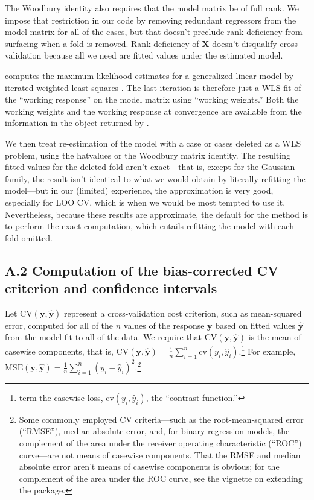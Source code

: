 \documentclass[
]{jss}
\begin{document}
The Woodbury identity also requires that the model matrix be of full
rank. We impose that restriction in our code by removing redundant
regressors from the model matrix for all of the cases, but that doesn't
preclude rank deficiency from surfacing when a fold is removed. Rank
deficiency of \(\mathbf{X}\) doesn't disqualify cross-validation because
all we need are fitted values under the estimated model.

 computes the maximum-likelihood estimates for a generalized
linear model by iterated weighted least squares \citep[see, e.g.,][Sec.
6.12]{FoxWeisberg:2019}. The last iteration is therefore just a WLS fit
of the ``working response'' on the model matrix using ``working
weights.'' Both the working weights and the working response at
convergence are available from the information in the object returned by
.

We then treat re-estimation of the model with a case or cases deleted as
a WLS problem, using the hatvalues or the Woodbury matrix identity. The
resulting fitted values for the deleted fold aren't exact---that is,
except for the Gaussian family, the result isn't identical to what we
would obtain by literally refitting the model---but in our (limited)
experience, the approximation is very good, especially for LOO CV, which
is when we would be most tempted to use it. Nevertheless, because these
results are approximate, the default for the  
method is to perform the exact computation, which entails refitting the
model with each fold omitted.

\subsection*{A.2 Computation of the bias-corrected CV criterion and
confidence
intervals}\label{a.2-computation-of-the-bias-corrected-cv-criterion-and-confidence-intervals}

Let \(\mathrm{CV}(\mathbf{y}, \widehat{\mathbf{y}})\) represent a
cross-validation cost criterion, such as mean-squared error, computed
for all of the \(n\) values of the response \(\mathbf{y}\) based on
fitted values \(\widehat{\mathbf{y}}\) from the model fit to all of the
data. We require that \(\mathrm{CV}(\mathbf{y}, \widehat{\mathbf{y}})\)
is the mean of casewise components, that is,
\(\mathrm{CV}(\mathbf{y}, \widehat{\mathbf{y}}) = \frac{1}{n}\sum_{i=1}^n\mathrm{cv}(y_i, \widehat{y}_i)\).\footnote{\citet{ArlotCelisse:2010}
  term the casewise loss, \(\mathrm{cv}(y_i, \widehat{y}_i)\), the
  ``contrast function.''} For example,
\(\mathrm{MSE}(\mathbf{y}, \widehat{\mathbf{y}}) = \frac{1}{n}\sum_{i=1}^n (y_i - \widehat{y}_i)^2\).\footnote{Some
  commonly employed CV criteria---such as the root-mean-squared error
  (``RMSE''), median absolute error, and, for binary-regression models,
  the complement of the area under the receiver operating characteristic
  (``ROC'') curve---are not means of casewise components. That the RMSE
  and median absolute error aren't means of casewise components is
  obvious; for the complement of the area under the ROC curve, see the
  vignette on extending the  package.}
\end{document}

